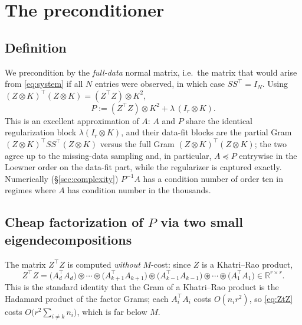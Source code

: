 \documentclass[12pt]{article}
\newcommand{\bR}{\mathbb{R}}
\begin{document}
\section{The preconditioner}\label{sec:prec}

\subsection{Definition}

We precondition by the \emph{full-data} normal matrix, i.e.\ the matrix
that would arise from \eqref{eq:system} if all $N$ entries were observed,
in which case $SS^{\top}=I_N$. Using
$(Z\otimes K)^{\top}(Z\otimes K)=(Z^{\top}Z)\otimes K^2$,
\begin{equation}\label{eq:Pdef}
  P:=(Z^{\top}Z)\otimes K^{2}+\lambda\,(I_r\otimes K).
\end{equation}
This is an excellent approximation of $A$: $A$ and $P$ share the identical
regularization block $\lambda(I_r\otimes K)$, and their data-fit blocks
are the partial Gram $(Z\otimes K)^{\top}SS^{\top}(Z\otimes K)$ versus the
full Gram $(Z\otimes K)^{\top}(Z\otimes K)$; the two agree up to the
missing-data sampling and, in particular, $A\preceq P$ entrywise in the
Loewner order on the data-fit part, while the regularizer is captured
exactly. Numerically (\S\ref{sec:complexity}) $P^{-1}A$ has a condition
number of order ten in regimes where $A$ has condition number in the
thousands.

\subsection{Cheap factorization of $P$ via two small eigendecompositions}

The matrix $Z^{\top}Z$ is computed \emph{without} $M$-cost: since $Z$ is a
Khatri--Rao product,
\begin{equation}\label{eq:ZtZ}
  Z^{\top}Z=\big(A_d^{\top}A_d\big)\circledast\cdots\circledast
  \big(A_{k+1}^{\top}A_{k+1}\big)\circledast
  \big(A_{k-1}^{\top}A_{k-1}\big)\circledast\cdots\circledast
  \big(A_1^{\top}A_1\big)\in\bR^{r\times r}.
\end{equation}
This is the standard identity that the Gram of a Khatri--Rao product is
the Hadamard product of the factor Grams; each $A_i^{\top}A_i$ costs
$O(n_i r^2)$, so \eqref{eq:ZtZ} costs $O\!\big(r^2\sum_{i\neq k}n_i\big)$,
which is far below $M$.
\end{document}
